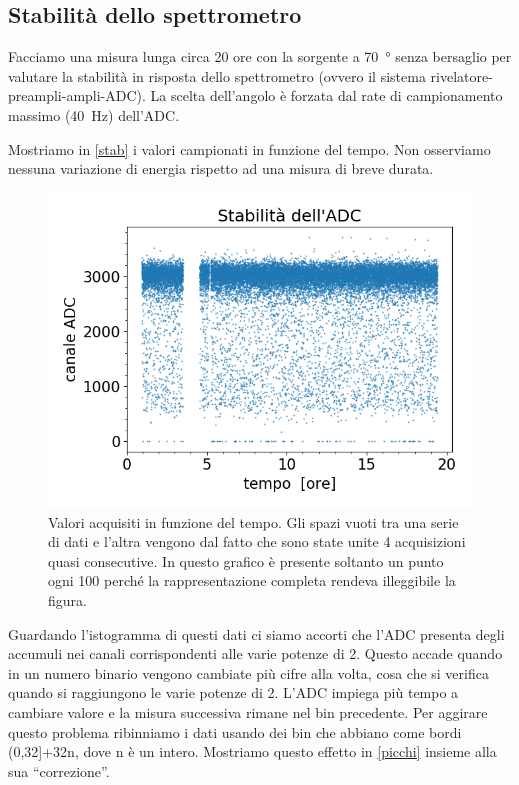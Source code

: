 \subsection{Stabilità dello spettrometro}

Facciamo una misura lunga circa 20 ore con la sorgente a \SI{70}{\degree} senza bersaglio per valutare la stabilità in risposta dello spettrometro (ovvero il sistema rivelatore-preampli-ampli-ADC).
La scelta dell'angolo è forzata dal rate di campionamento massimo (\SI{40}{Hz}) dell'ADC.

Mostriamo in \autoref{stab} i valori campionati in funzione del tempo. Non osserviamo nessuna variazione di energia rispetto ad una misura di breve durata.

\begin{figure}[h]
\centering
\includegraphics[width=30 em]{immagini/stab.png}
\caption{Valori acquisiti in funzione del tempo. Gli spazi vuoti tra una serie di dati e l'altra vengono dal fatto che sono state unite 4 acquisizioni quasi consecutive.
In questo grafico è presente soltanto un punto ogni 100 perché la rappresentazione completa rendeva illeggibile la figura.}
\label{stab}
\end{figure}

Guardando l'istogramma di questi dati ci siamo accorti che l'ADC presenta degli accumuli nei canali corrispondenti alle varie potenze di 2. Questo accade quando in un numero binario vengono cambiate più cifre alla volta, cosa che si verifica quando si raggiungono le varie potenze di 2. L'ADC impiega più tempo a cambiare valore e la misura successiva rimane nel bin precedente.
Per aggirare questo problema ribinniamo i dati usando dei bin che abbiano come bordi (0,32]+32n, dove n è un intero. Mostriamo questo effetto in \autoref{picchi} insieme alla sua ``correzione''.

